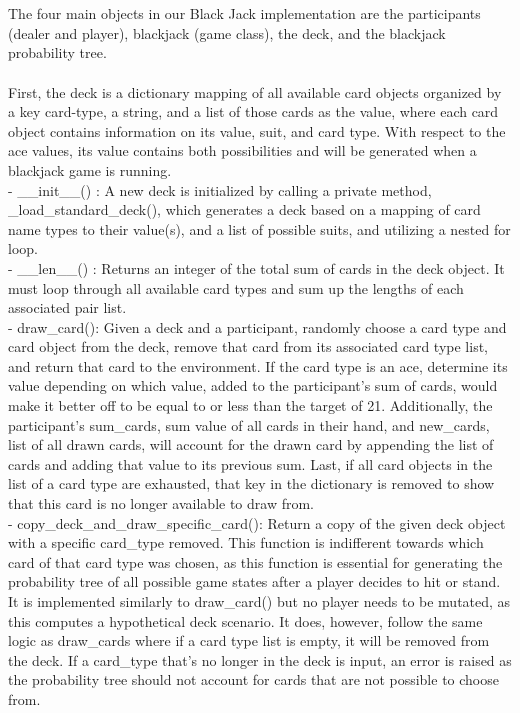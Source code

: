 \documentclass[fontsize=11pt]{article}
\begin{document}
\\\\
The four main objects in our Black Jack implementation are the participants (dealer and player), blackjack (game class), the deck, and the blackjack probability tree.
\\\\
First, the deck is a dictionary mapping of all available card objects organized by a key card-type, a string, and a list of those cards as the value, where each card object contains information on its value, suit, and card type. With respect to the ace values, its value contains both possibilities and will be generated when a blackjack game is running.
\\
- \_\_init\_\_() : A new deck is initialized by calling a private method, \_load\_standard\_deck(), which generates a deck based on a mapping of card name types to their value(s), and a list of possible suits, and utilizing a nested for loop.
\\
- \_\_len\_\_() : Returns an integer of the total sum of cards in the deck object. It must loop through all available card types and sum up the lengths of each associated pair list.
\\
- draw\_card(): Given a deck and a participant, randomly choose a card type and card object from the deck, remove that card from its associated card type list, and return that card to the environment. If the card type is an ace, determine its value depending on which value, added to the participant’s sum of cards, would make it better off to be equal to or less than the target of 21. Additionally, the participant’s sum\_cards, sum value of all cards in their hand, and new\_cards, list of all drawn cards, will account for the drawn card by appending the list of cards and adding that value to its previous sum. Last, if all card objects in the list of a card type are exhausted, that key in the dictionary is removed to show that this card is no longer available to draw from.
\\
- copy\_deck\_and\_draw\_specific\_card(): Return a copy of the given deck object with a specific card\_type removed. This function is indifferent towards which card of that card type was chosen, as this function is essential for generating the probability tree of all possible game states after a player decides to hit or stand. It is implemented similarly to draw\_card() but no player needs to be mutated, as this computes a hypothetical deck scenario. It does, however, follow the same logic as draw\_cards where if a card type list is empty, it will be removed from the deck. If a card\_type that’s no longer in the deck is input, an error is raised as the probability tree should not account for cards that are not possible to choose from.
\end{document}
